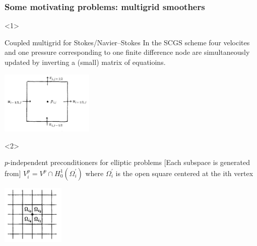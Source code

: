 \documentclass[presentation,aspectratio=43, 10pt]{beamer}
\begin{document}
\begin{frame}[t]
  \frametitle{Some motivating problems: multigrid smoothers}
  \begin{onlyenv}<1>
    \begin{block}{Coupled multigrid for Stokes/Navier--Stokes}
      In the SCGS scheme four velocites and one pressure
      corresponding to one finite difference node are simultaneously
      updated by inverting a (small) matrix of equatioins.

      \begin{center}
        \includegraphics[height=3cm]{vanka}
      \end{center}
      \begin{flushright}
        \textcite{Vanka:1986} \hspace{4em}
      \end{flushright}
    \end{block}
  \end{onlyenv}
  \begin{onlyenv}<2>
    \begin{block}{$p$-independent preconditioners for elliptic problems}
      [Each subspace is generated from]
      $V_i^p = V^p \cap H^1_0(\Omega_i^{'})$ where $\Omega_i^{'}$ is the open square
      centered at the ith vertex
      \begin{center}
        \includegraphics[width=3cm]{pavarino}
      \end{center}
      \begin{flushright}
        \textcite{Pavarino:1993} \hspace{4em}
      \end{flushright}
    \end{block}
  \end{onlyenv}


\end{frame}
\end{document}

